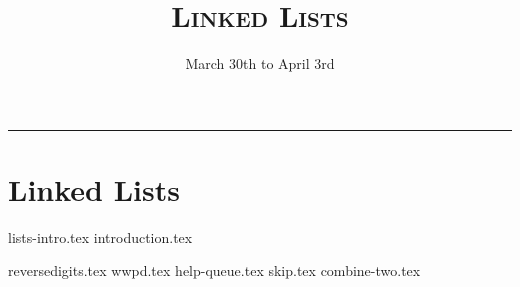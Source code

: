 \documentclass{exam}
\title{\textsc{Linked Lists}}
\date{March 30th to April 3rd}
\begin{document}
\maketitle
\rule{\textwidth}{0.15em}
\fontsize{12}{15}\selectfont


\section{Linked Lists}
{lists-intro.tex}
{introduction.tex}
\begin{questions}
{reversedigits.tex}
{wwpd.tex}
\newpage
{help-queue.tex}
\newpage
{skip.tex}
\newpage
{combine-two.tex}
\end{questions}
\end{document}
